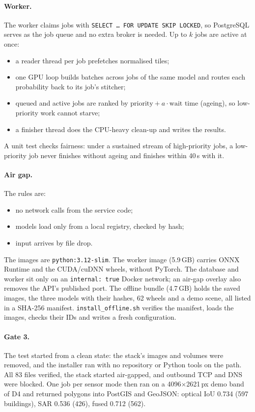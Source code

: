 \documentclass[11pt,a4paper]{article}
\begin{document}
\paragraph{Worker.} The worker claims jobs with \texttt{SELECT \dots{} FOR UPDATE SKIP
LOCKED}, so PostgreSQL serves as the job queue and no extra broker is needed. Up to
$k$ jobs are active at once:
\begin{itemize}
\item a reader thread per job prefetches normalised tiles;
\item one GPU loop builds batches across jobs of the same model and routes each probability
back to its job's stitcher;
\item queued and active jobs are ranked by $\text{priority} + a\cdot\text{wait time}$
(ageing), so low-priority work cannot starve;
\item a finisher thread does the CPU-heavy clean-up and writes the results.
\end{itemize}
A unit test checks fairness: under a sustained stream of high-priority jobs, a
low-priority job never finishes without ageing and finishes within 40\,s with it.

\paragraph{Air gap.} The rules are:
\begin{itemize}
\item no network calls from the service code;
\item models load only from a local registry, checked by hash;
\item input arrives by file drop.
\end{itemize}
The images are \texttt{python:3.12-slim}. The worker image (5.9\,GB) carries ONNX Runtime and
the CUDA/cuDNN wheels, without PyTorch. The database and worker sit only on an
\texttt{internal: true} Docker network; an air-gap overlay also removes the API's published
port. The offline bundle (4.7\,GB) holds the saved images, the three models with their
hashes, 62 wheels and a demo scene, all listed in a SHA-256 manifest.
\texttt{install\_offline.sh} verifies the manifest, loads the images, checks their IDs and
writes a fresh configuration.

\paragraph{Gate 3.} The test started from a clean state: the stack's images and volumes
were removed, and the installer ran with no repository or Python tools on the path. All 83
files verified, the stack started air-gapped, and outbound TCP and DNS were blocked. One
job per sensor mode then ran on a 4096$\times$2621\,px demo band of D4 and returned
polygons into PostGIS and GeoJSON: optical IoU 0.734 (597 buildings), SAR 0.536 (426),
fused 0.712 (562).
\end{document}
